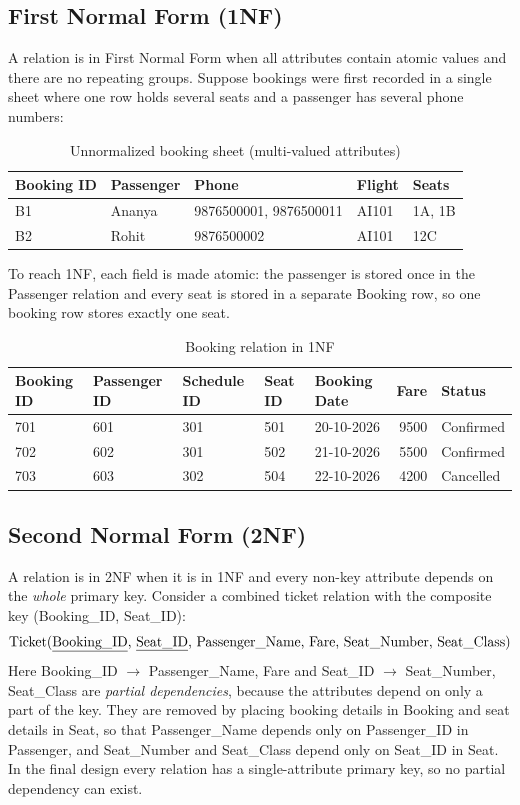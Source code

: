 \documentclass[12pt,a4paper]{article}
\begin{document}
\subsection{First Normal Form (1NF)}
A relation is in First Normal Form when all attributes contain atomic values and there are no repeating
groups. Suppose bookings were first recorded in a single sheet where one row holds several seats and a
passenger has several phone numbers:
\begin{table}[H]
\centering\small
\begin{tabular}{l l l l l}
\toprule
\textbf{Booking ID} & \textbf{Passenger} & \textbf{Phone} & \textbf{Flight} & \textbf{Seats}\\
\midrule
B1 & Ananya & 9876500001, 9876500011 & AI101 & 1A, 1B\\
B2 & Rohit  & 9876500002             & AI101 & 12C\\
\bottomrule
\end{tabular}
\caption{Unnormalized booking sheet (multi-valued attributes)}
\end{table}
To reach 1NF, each field is made atomic: the passenger is stored once in the Passenger relation and every
seat is stored in a separate Booking row, so one booking row stores exactly one seat.
\begin{table}[H]
\centering\small
\begin{tabular}{l l l l l r l}
\toprule
\textbf{Booking ID} & \textbf{Passenger ID} & \textbf{Schedule ID} & \textbf{Seat ID} & \textbf{Booking Date} & \textbf{Fare} & \textbf{Status}\\
\midrule
701 & 601 & 301 & 501 & 20-10-2026 & 9500 & Confirmed\\
702 & 602 & 301 & 502 & 21-10-2026 & 5500 & Confirmed\\
703 & 603 & 302 & 504 & 22-10-2026 & 4200 & Cancelled\\
\bottomrule
\end{tabular}
\caption{Booking relation in 1NF}
\end{table}

\subsection{Second Normal Form (2NF)}
A relation is in 2NF when it is in 1NF and every non-key attribute depends on the \emph{whole} primary key.
Consider a combined ticket relation with the composite key (Booking_ID, Seat_ID):
\[
\text{Ticket(\underline{Booking\_ID}, \underline{Seat\_ID}, Passenger\_Name, Fare, Seat\_Number, Seat\_Class)}
\]
Here Booking_ID $\rightarrow$ Passenger_Name, Fare and Seat_ID $\rightarrow$ Seat_Number, Seat_Class are
\emph{partial dependencies}, because the attributes depend on only a part of the key. They are removed by
placing booking details in Booking and seat details in Seat, so that Passenger_Name depends only on
Passenger_ID in Passenger, and Seat_Number and Seat_Class depend only on Seat_ID in Seat. In the final
design every relation has a single-attribute primary key, so no partial dependency can exist.
\end{document}
